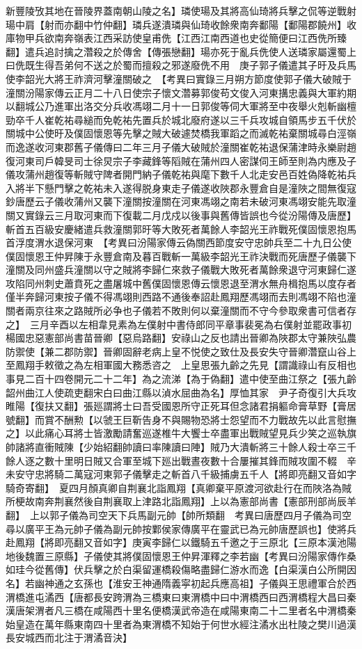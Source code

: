 新豐陵攷其地在晉陵界蓋南朝山陵之名】璘使瑒及其將高仙琦將兵擊之侃等逆戰射瑒中肩【射而亦翻中竹仲翻】璘兵遂潰璘與仙琦收餘衆南奔鄱陽【鄱陽郡饒州】收庫物甲兵欲南奔嶺表江西采訪使皇甫侁【江西江南西道也史從簡便曰江西侁所臻翻】遣兵追討擒之濳殺之於傳舍【傳張戀翻】瑒亦死于亂兵侁使人送璘家屬還蜀上曰侁既生得吾弟何不送之於蜀而擅殺之邪遂廢侁不用　庚子郭子儀遣其子旴及兵馬使李韶光大將王祚濟河擊潼關破之　【考異曰實錄三月朔方節度使郭子儀大破賊于潼關汾陽家傳云正月二十八日使宗子懷文濳募郭俊苟文俊入河東搆忠義與大軍約期以翻城公乃進軍出洛交分兵收馮翊二月十一日郭俊等伺大軍將至中夜舉火剋斬幽檀勁卒千人崔乾祐尋縋而免乾祐先置兵於城北廢府遂以三千兵攻城自領馬步五千伏於關城中公使旴及僕固懷恩等先擊之賊大破遽焚橋我軍蹈之而滅乾祐棄關城尋白涇嶺而逸遂收河東郡舊子儀傳曰二年三月子儀大破賊於潼關崔乾祐退保蒲津時永樂尉趙復河東司戶韓旻司士徐炅宗子李藏鋒等䧟賊在蒲州四人密謀伺王師至則為内應及子儀攻蒲州趙復等斬賊守陴者開門納子儀乾祐與麾下數千人北走安邑百姓偽降乾祐兵入將半下懸門擊之乾祐未入遂得脱身東走子儀遂收陜郡永豐倉自是潼陜之間無復寇鈔唐歷云子儀收蒲州又襲下潼關按潼關在河東馮翊之南若未破河東馮翊安能先取潼關又實錄云三月取河東而下復載二月戊戍以後事與舊傳皆誤也今從汾陽傳及唐歷】斬首五百級安慶緒遣兵救潼關郭旴等大敗死者萬餘人李韶光王祚戰死僕固懷恩抱馬首浮度渭水退保河東　【考異曰汾陽家傳云偽關西節度安守忠帥兵至二十九日公使僕固懷恩王仲昇陳于永豐倉南及暮百戰斬一萬級李韶光王祚決戰而死唐歷子儀襲下潼關及同州盛兵潼關以守之賊將李歸仁來救子儀戰大敗死者萬餘衆退守河東歸仁遂攻陷同州刺史蕭賁死之盡屠城中舊僕固懷恩傳云懷恩退至渭水無舟楫抱馬以度存者僅半奔歸河東按子儀不得馮翊則西路不通後奉詔赴鳳翔歷馮翊而去則馮翊不陷也潼關者兩京往來之路賊所必争也子儀若不敗則何以棄潼關而不守今參取衆書可信者存之】　三月辛酉以左相韋見素為左僕射中書侍郎同平章事裴冕為右僕射並罷政事初楊國忠惡憲部尚書苗晉卿【惡烏路翻】安祿山之反也請出晉卿為陜郡太守兼陜弘農防禦使【兼二郡防禦】晉卿固辭老病上皇不悦使之致仕及長安失守晉卿濳竄山谷上至鳳翔手敕徵之為左相軍國大務悉咨之　上皇思張九齡之先見【謂識祿山有反相也事見二百十四卷開元二十二年】為之流涕【為于偽翻】遣中使至曲江祭之【張九齡韶州曲江人使疏吏翻宋白曰曲江縣以湞水屈曲為名】厚恤其家　尹子奇復引大兵攻睢陽【復扶又翻】張廵謂將士曰吾受國恩所守正死耳但念諸君捐軀命膏草野【膏居號翻】而賞不酬勲【以虢王巨靳告身不與賜物恐將士怨望而不力戰故先以此言慰撫之】以此痛心耳將士皆激勵請奮巡遂椎牛大饗士卒盡軍出戰賊望見兵少笑之巡執旗帥諸將直衝賊陳【少始紹翻帥讀曰率陳讀曰陣】賊乃大潰斬將三十餘人殺士卒三千餘人逐之數十里明日賊又合軍至城下廵出戰晝夜數十合屢摧其鋒而賊攻圍不輟　辛未安守忠將騎二萬寇河東郭子儀擊走之斬首八千級捕虜五千人【將即亮翻又音如字騎奇寄翻】　夏四月顏真卿自荆襄北詣鳳翔【真卿棄平原渡河欲赴行在而陜洛為賊所梗故南奔荆襄然後自荆襄取上津路北詣鳳翔】上以為憲部尚書【憲部刑部尚辰羊翻】　上以郭子儀為司空天下兵馬副元帥【帥所類翻　考異曰唐歷四月子儀為司空尋以廣平王為元帥子儀為副元帥按鄴侯家傳廣平在靈武已為元帥唐歷誤也】使將兵赴鳳翔【將即亮翻又音如字】庚寅李歸仁以鐵騎五千邀之于三原北【三原本漢池陽地後魏置三原縣】子儀使其將僕固懷恩王仲昇渾釋之李若幽【考異曰汾陽家傳作桑如珪今從舊傳】伏兵擊之於白渠留運橋殺傷略盡歸仁游水而逸【白渠漢白公所開因名】若幽神通之玄孫也【淮安王神通隋義寜初起兵應高祖】子儀與王思禮軍合於西渭橋進屯潏西【唐都長安跨渭為三橋東曰東渭橋中曰中渭橋西曰西渭橋程大昌曰秦漢唐架渭者凡三橋在咸陽西十里名便橋漢武帝造在咸陽東南二十二里者名中渭橋秦始皇造在萬年縣東南四十里者為東渭橋不知始于何世水經注潏水出杜陵之樊川過漢長安城西而北注于渭潏音決】